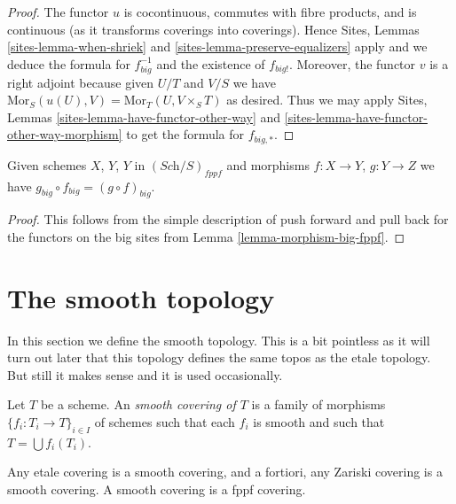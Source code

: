 \begin{proof}
The functor $u$ is cocontinuous, commutes with fibre products,
and is continuous (as it transforms coverings into coverings).
Hence Sites, Lemmas \ref{sites-lemma-when-shriek}
and \ref{sites-lemma-preserve-equalizers}
apply and we deduce the formula
for $f_{big}^{-1}$ and the existence of $f_{big!}$. Moreover,
the functor $v$ is a right adjoint because given $U/T$ and $V/S$
we have $\text{Mor}_S(u(U), V) = \text{Mor}_T(U, V\times_S T)$
as desired. Thus we may apply
Sites, Lemmas \ref{sites-lemma-have-functor-other-way} and
\ref{sites-lemma-have-functor-other-way-morphism} to get the
formula for $f_{big, *}$.
\end{proof}

\begin{lemma}
\label{lemma-composition-fppf}
Given schemes $X$, $Y$, $Y$ in $(\textit{Sch}/S)_{fppf}$
and morphisms $f : X \to Y$, $g : Y \to Z$ we have
$g_{big} \circ f_{big} = (g \circ f)_{big}$.
\end{lemma}

\begin{proof}
This follows from the simple description of push forward
and pull back for the functors on the big sites from
Lemma \ref{lemma-morphism-big-fppf}.
\end{proof}















\section{The smooth topology}
\label{section-smooth}

\noindent
In this section we define the smooth topology.
This is a bit pointless as it will turn out later
that this topology defines the same topos as the
etale topology. But still it makes sense and it is used
occasionally.

\begin{definition}
\label{definition-smooth-covering}
Let $T$ be a scheme. An {\it smooth covering of $T$} is a family
of morphisms $\{f_i : T_i \to T\}_{i \in I}$ of schemes
such that each $f_i$ is smooth and such
that $T = \bigcup f_i(T_i)$.
\end{definition}

\begin{lemma}
\label{lemma-zariski-etale-smooth}
Any etale covering is a smooth covering, and a fortiori,
any Zariski covering is a smooth covering. A smooth covering
is a fppf covering.
\end{lemma}

